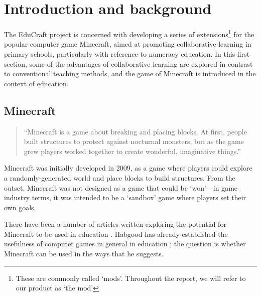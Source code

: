 \chapter{Introduction and background}
The EduCraft project is concerned with developing a series of
extensions\footnote{These are commonly called `mods'. Throughout the report, we will refer to our product as `the mod'} for the popular computer game
Minecraft, aimed at promoting collaborative learning in primary schools,
particularly with reference to numeracy education. In this first section, some
of the advantages of collaborative learning are explored in contrast to
conventional teaching methods, and the game of Minecraft is introduced in the
context of education.

\section{Minecraft}
\begin{quote}
``Minecraft is a game about breaking and placing blocks. At first, people
built structures to protect against nocturnal monsters, but as the game grew
players worked together to create wonderful, imaginative things.''
\cite{website:minecraft}
\end{quote}

Minecraft was initially developed in 2009, as a game where players could
explore a randomly-generated world and place blocks to build structures. From
the outset, Minecraft was not designed as a game that could be `won'---in
game industry terms, it was intended to be a `sandbox' game where players set
their own goals.

There have been a number of articles written exploring the potential for
Minecraft to be used in education \cite{brand13,short2012}. Habgood has
already established the usefulness of computer games in general in education
\cite{habgood2007}; the question is whether Minecraft can be used in the ways
that he suggests.
